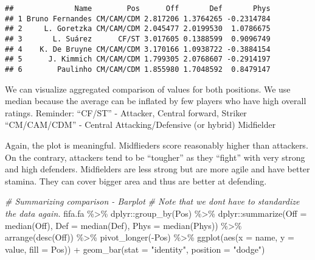 \documentclass[
]{article}
\newenvironment{Shaded}{\begin{snugshade}}{\end{snugshade}}
\newcommand{\AttributeTok}[1]{\textcolor[rgb]{0.77,0.63,0.00}{#1}}
\newcommand{\CommentTok}[1]{\textcolor[rgb]{0.56,0.35,0.01}{\textit{#1}}}
\newcommand{\FunctionTok}[1]{\textcolor[rgb]{0.00,0.00,0.00}{#1}}
\newcommand{\NormalTok}[1]{#1}
\newcommand{\SpecialCharTok}[1]{\textcolor[rgb]{0.00,0.00,0.00}{#1}}
\newcommand{\StringTok}[1]{\textcolor[rgb]{0.31,0.60,0.02}{#1}}
\begin{document}
\begin{verbatim}
##              Name        Pos      Off       Def       Phys
## 1 Bruno Fernandes CM/CAM/CDM 2.817206 1.3764265 -0.2314784
## 2     L. Goretzka CM/CAM/CDM 2.045477 2.0199530  1.0786675
## 3       L. Suárez      CF/ST 3.017605 0.1388599  0.9096749
## 4    K. De Bruyne CM/CAM/CDM 3.170166 1.0938722 -0.3884154
## 5      J. Kimmich CM/CAM/CDM 1.799305 2.0768607 -0.2914197
## 6        Paulinho CM/CAM/CDM 1.855980 1.7048592  0.8479147
\end{verbatim}

We can visualize aggregated comparison of values for both positions. We
use median because the average can be inflated by few players who have
high overall ratings. Reminder: ``CF/ST'' - Attacker, Central forward,
Striker ``CM/CAM/CDM'' - Central Attacking/Defensive (or hybrid)
Midfielder

Again, the plot is meaningful. Midflieders score reasonably higher than
attackers. On the contrary, attackers tend to be ``tougher'' as they
``fight'' with very strong and high defenders. Midfielders are less
strong but are more agile and have better stamina. They can cover bigger
area and thus are better at defending.

\begin{Shaded}
\begin{Highlighting}[]
\CommentTok{\# Summarizing comparison {-} Barplot}
\CommentTok{\# Note that we don\textquotesingle{}t have to standardize the data again.}
\NormalTok{fifa.fa }\SpecialCharTok{\%\textgreater{}\%} 
\NormalTok{    dplyr}\SpecialCharTok{::}\FunctionTok{group\_by}\NormalTok{(Pos) }\SpecialCharTok{\%\textgreater{}\%}
\NormalTok{    dplyr}\SpecialCharTok{::}\FunctionTok{summarize}\NormalTok{(}\AttributeTok{Off =} \FunctionTok{median}\NormalTok{(Off),}
                     \AttributeTok{Def =} \FunctionTok{median}\NormalTok{(Def),}
                     \AttributeTok{Phys =} \FunctionTok{median}\NormalTok{(Phys)) }\SpecialCharTok{\%\textgreater{}\%}
    \FunctionTok{arrange}\NormalTok{(}\FunctionTok{desc}\NormalTok{(Off)) }\SpecialCharTok{\%\textgreater{}\%}
    \FunctionTok{pivot\_longer}\NormalTok{(}\SpecialCharTok{{-}}\NormalTok{Pos) }\SpecialCharTok{\%\textgreater{}\%}
    \FunctionTok{ggplot}\NormalTok{(}\FunctionTok{aes}\NormalTok{(}\AttributeTok{x =}\NormalTok{ name, }\AttributeTok{y =}\NormalTok{ value, }\AttributeTok{fill =}\NormalTok{ Pos)) }\SpecialCharTok{+}
    \FunctionTok{geom\_bar}\NormalTok{(}\AttributeTok{stat =} \StringTok{"identity"}\NormalTok{, }\AttributeTok{position =} \StringTok{"dodge"}\NormalTok{)}
\end{Highlighting}
\end{Shaded}
\end{document}
